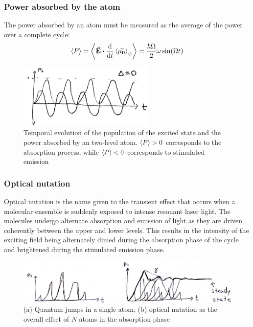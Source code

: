 \subsubsection*{Power absorbed by the atom}
The power absorbed by an atom must be measured as the average of the power over a complete cycle:
\begin{align}
	\ev{P} = \ev{ \va{E}\vdot \dv{t}\ev{\va{\mu_{0}}}_{\psi} } = \frac{\hbar \Omega}{2} \omega \sin(\Omega t)
\end{align}
\begin{figure}[H]
	\centering
	\includegraphics[width=0.6\textwidth]{./images/3-rabi-power}
	\caption{Temporal evolution of the population of the excited state and the power absorbed by an two-level atom. $\ev{P} > 0$ corresponds to the absorption process, while $\ev{P} < 0$ corresponds to stimulated emission}
	\label{fig:rabi-power}
\end{figure}

\subsubsection*{Optical nutation}
Optical nutation is the name given to the transient effect that occurs when a molecular ensemble is suddenly exposed to intense resonant laser light. The molecules undergo alternate absorption and emission of light as they are driven coherently between the upper and lower levels. This results in the intensity of the exciting field being alternately dimed during the absorption phase of the cycle and brightened during the stimulated emission phase.
\begin{figure}[H]
	\centering
	\includegraphics[width=\textwidth]{./images/3-optical-nutation}
	\caption{(a) Quantum jumps in a single atom, (b) optical nutation as the overall effect of $N$ atoms in the absorption phase}
	\label{fig:optical-nutation}
\end{figure}


